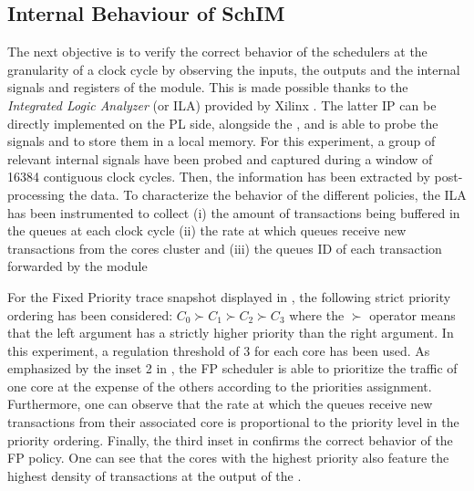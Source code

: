 \subsection{Internal Behaviour of SchIM}
\label{subsec:internal-behaviour-of-schim}
The next objective is to verify the correct behavior of the schedulers
at the granularity of a clock cycle by observing the inputs,
the outputs and the internal signals and registers of the \schim
module. This is made possible thanks to the \emph{Integrated Logic
  Analyzer} (or ILA) provided by Xilinx \cite{Xilinx-ILA}. The latter
IP can be directly implemented on the PL side, alongside the \schim,
and is able to probe the signals and to store them in a local
memory. For this experiment, a group of relevant internal signals have
been probed and captured during a window of 16384 contiguous clock
cycles. Then, the information has been extracted by post-processing
the data. To characterize the behavior of the  different
policies, the ILA has been instrumented to collect (i) the amount of
transactions being buffered in the queues at each clock cycle
(ii) the rate at which queues receive
new transactions from the cores cluster
 and (iii) the queues ID of each
transaction forwarded by the \schim module

For the Fixed Priority trace snapshot displayed in
, the following strict priority ordering
has been considered: $C_{0} \succ C_{1} \succ C_{2} \succ C_{3}$ where
the $\succ$ operator means that the left argument has a strictly
higher priority than the right argument. In this experiment, a
regulation threshold of 3 for each core has been used.  As emphasized
by the inset 2 in , the FP scheduler is
able to prioritize the traffic of one core at the expense of the
others according to the priorities assignment. Furthermore, one can
observe that the rate at which the queues receive new transactions
from their associated core is proportional to the priority level in
the priority ordering.  Finally, the third inset in
 confirms the correct behavior of the FP
policy.%
One can see that the cores with the highest priority also feature the
highest density of transactions at the output of the \schim.


